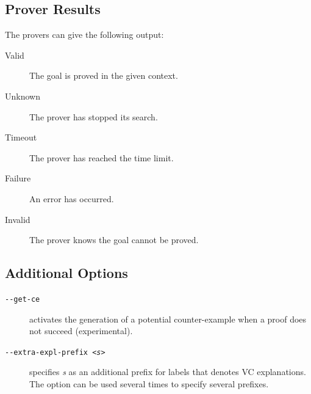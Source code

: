 
\subsection{Prover Results}
The provers can give the following output:
\begin{description}
\item[Valid] The goal is proved in the given context.
\item[Unknown] The prover has stopped its search.
\item[Timeout] The prover has reached the time limit.
\item[Failure] An error has occurred.
\item[Invalid] The prover knows the goal cannot be proved.
\end{description}


\subsection{Additional Options}
\label{sec:proveoptions}

\begin{description}
\item[\texttt{-{}-get-ce}] activates the generation of a potential
counter-example when a proof does not succeed (experimental).
\item[\texttt{-{}-extra-expl-prefix \textsl{<s>}}] specifies
  \textsl{s} as an additional prefix for labels that denotes VC
  explanations. The option can be used several times to specify
  several prefixes.
\end{description}

